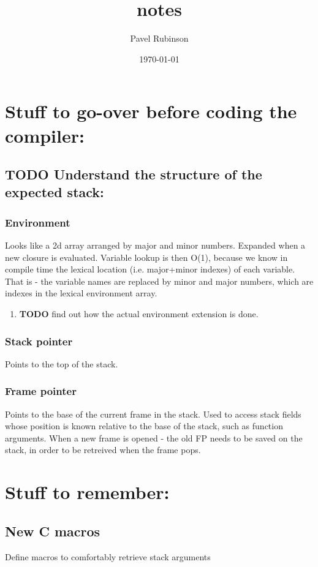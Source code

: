 \documentclass[11pt]{article}
\author{Pavel Rubinson}
\date{\today}
\title{notes}
\begin{document}
\maketitle
\tableofcontents


\section{Stuff to go-over before coding the compiler:}
\label{sec-1}
\subsection{{\bfseries\sffamily TODO} Understand the structure of the expected stack:}
\label{sec-1-1}
\subsubsection{Environment}
\label{sec-1-1-1}
Looks like a 2d array arranged by major and minor numbers. Expanded when a new closure is evaluated.
Variable lookup is then O(1), because we know in compile time the lexical location (i.e. major+minor indexes) 
of each variable. That is - the variable names are replaced by minor and major numbers, which are indexes in the 
lexical environment array.
\begin{enumerate}
\item {\bfseries\sffamily TODO} find out how the actual environment extension is done.
\label{sec-1-1-1-1}
\end{enumerate}
\subsubsection{Stack pointer}
\label{sec-1-1-2}
Points to the top of the stack.
\subsubsection{Frame pointer}
\label{sec-1-1-3}
Points to the base of the current frame in the stack.
Used to access stack fields whose position is known relative to the base of the stack, such as function arguments.
When a new frame is opened - the old FP needs to be saved on the stack, in order to be retreived when the frame pops.

\section{Stuff to remember:}
\label{sec-2}
\subsection{New C macros}
\label{sec-2-1}
Define macros to comfortably retrieve stack arguments
\end{document}
